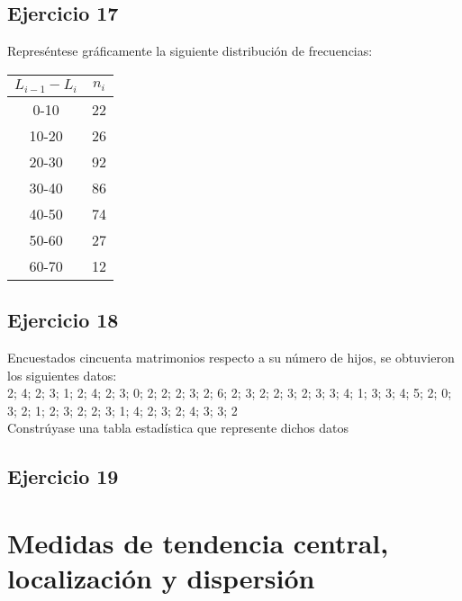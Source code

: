 \documentclass[11pt,letterpaper]{report}
\begin{document}
      \subsection*{Ejercicio 17}
        Represéntese gráficamente la siguiente distribución de frecuencias:
        \begin{table}[!h]
            \centering
            \begin{tabular}{|c|c|}
                \hline
                $L_{i-1}-L_i$  & $n_i$\\
                \hline
                0-10& 22\\
                \hline
                10-20& 26\\
                \hline
                20-30& 92\\
                \hline
                30-40& 86\\
                \hline
                40-50& 74\\
                \hline
                50-60& 27\\
                \hline
                60-70& 12\\
                \hline
            \end{tabular}
        \end{table}
      \subsection*{Ejercicio 18}
        Encuestados cincuenta matrimonios respecto a su número de hijos, se obtuvieron los siguientes datos:\\

        2; 4; 2; 3; 1; 2; 4; 2; 3; 0; 2; 2; 2; 3; 2; 6; 2; 3; 2; 2; 3; 2; 3; 3; 4; 1; 3; 3; 4; 5; 2; 0; 3; 2; 1; 2; 3; 2; 2; 3; 1; 4; 2; 3; 2; 4; 3; 3; 2\\

        Constrúyase una tabla estadística que represente dichos datos
      \subsection*{Ejercicio 19}



    \section{Medidas de tendencia central, localización y dispersión}
\end{document}
